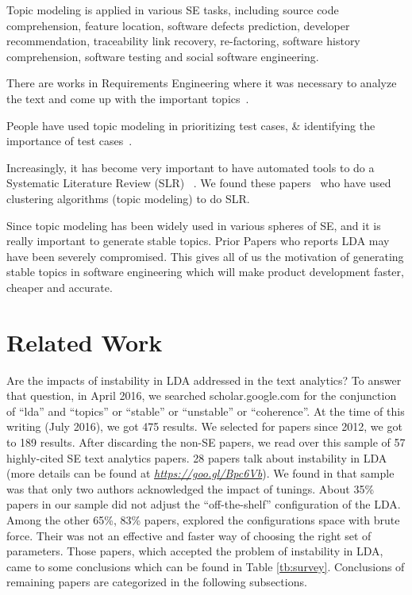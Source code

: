 \documentclass[10pt,conference]{IEEEtran}
\theoremstyle{break}
\begin{document}
\begin{compactitem}
    \item Topic modeling is applied in various SE tasks, including source code comprehension, feature location, software defects prediction, developer recommendation, traceability link recovery, re-factoring, software history comprehension, software testing and social software engineering.
    \item There are works in Requirements Engineering where it was necessary to analyze the text and come up with the important topics~\cite{asuncion2010software, thomas2014studying, massey2013automated}.
    \item People have used topic modeling in prioritizing test cases, \& identifying the importance of test cases~\cite{hemmati2015prioritizing, zhang2015inferring, yang2015predicting}.
    \item Increasingly, it has become very important to have automated tools to do a Systematic Literature Review (SLR) ~\cite{tsafnat2014systematic}. We found these papers~\cite{restificar2012inferring,alreview,marshall2013tools} who have used clustering algorithms (topic modeling) to do SLR.
\end{compactitem}

Since topic modeling has been widely used in various spheres of SE, and it is really important to generate stable topics. Prior Papers who reports LDA may have been severely compromised. This gives all of us the motivation of generating stable topics in software engineering which will make product development faster, cheaper and accurate.

\section{Related Work}



Are the impacts of instability in LDA addressed in the text analytics? To answer that question, in April 2016, we searched scholar.google.com for the conjunction of “lda” and “topics” or “stable” or “unstable” or “coherence”. At the time of this writing (July 2016), we got 475 results. We selected for papers since 2012, we got to 189 results. After discarding the non-SE papers, we read over this sample of 57 highly-cited SE text analytics papers. 28 papers talk about instability in LDA (more details can be found at \href{https://goo.gl/Bpc6Vb}{\textit{https://goo.gl/Bpc6Vb}}). We found in that sample was that only two authors acknowledged the impact of tunings. About 35\% papers in our sample did not adjust the “off-the-shelf” configuration of the LDA. Among the other 65\%, 83\% papers, explored the configurations space with brute force. Their was not an effective and faster way of choosing the right set of parameters. Those papers, which accepted the problem of instability in LDA, came to some conclusions which can be found in Table \ref{tb:survey}. Conclusions of remaining papers are categorized in the following subsections.
\end{document}
